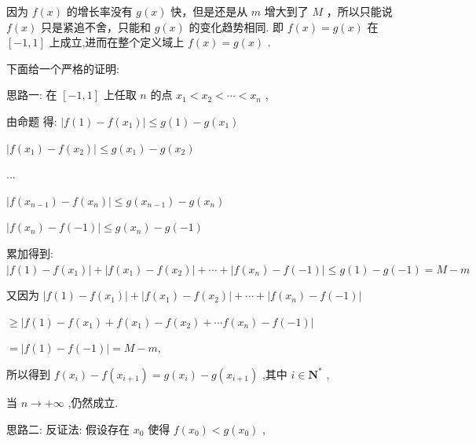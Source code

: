 \documentclass[10pt]{article}
\newcommand*\circled[1]{\tikz[baseline=(char.base)]{\node[shape=circle,draw,inner sep=1.5pt] (char) {\small #1};}}
\begin{document}
因为 \(f\left( x\right)\) 的增长率没有 \(g\left( x\right)\) 快，但是还是从 \(m\) 增大到了 \(M\) ，所以只能说 \(f\left( x\right)\) 只是紧追不舍，只能和 \(g\left( x\right)\) 的变化趋势相同. 即 \(f\left( x\right)  = g\left( x\right)\) 在 \(\left\lbrack  {-1,1}\right\rbrack\) 上成立,进而在整个定义域上 \(f\left( x\right)  = g\left( x\right)\) .

下面给一个严格的证明:

思路一: 在 \(\left\lbrack  {-1,1}\right\rbrack\) 上任取 \(n\) 的点 \({x}_{1} < {x}_{2} < \cdots  < {x}_{n}\) ,

由命题 \circled{1} 得: \(\left| {f\left( 1\right)  - f\left( {x}_{1}\right) }\right|  \leq  g\left( 1\right)  - g\left( {x}_{1}\right)\)

\(\left| {f\left( {x}_{1}\right)  - f\left( {x}_{2}\right) }\right|  \leq  g\left( {x}_{1}\right)  - g\left( {x}_{2}\right)\)

...

\(\left| {f\left( {x}_{n - 1}\right)  - f\left( {x}_{n}\right) }\right|  \leq  g\left( {x}_{n - 1}\right)  - g\left( {x}_{n}\right)\)

\(\left| {f\left( {x}_{n}\right)  - f\left( {-1}\right) }\right|  \leq  g\left( {x}_{n}\right)  - g\left( {-1}\right)\)

累加得到: \(\left| {f\left( 1\right)  - f\left( {x}_{1}\right) }\right|  + \left| {f\left( {x}_{1}\right)  - f\left( {x}_{2}\right) }\right|  + \cdots  + \left| {f\left( {x}_{n}\right)  - f\left( {-1}\right) }\right|  \leq  g\left( 1\right)  - g\left( {-1}\right)  = M - m\)

又因为 \(\left| {f\left( 1\right)  - f\left( {x}_{1}\right) }\right|  + \left| {f\left( {x}_{1}\right)  - f\left( {x}_{2}\right) }\right|  + \cdots  + \left| {f\left( {x}_{n}\right)  - f\left( {-1}\right) }\right|\)

\(\geq  \left| {f\left( 1\right)  - f\left( {x}_{1}\right)  + f\left( {x}_{1}\right)  - f\left( {x}_{2}\right)  + \cdots f\left( {x}_{n}\right)  - f\left( {-1}\right) }\right|\)

\(= \left| {f\left( 1\right)  - f\left( {-1}\right) }\right|  = M - m,\)

所以得到 \(f\left( {x}_{i}\right)  - f\left( {x}_{i + 1}\right)  = g\left( {x}_{i}\right)  - g\left( {x}_{i + 1}\right)\) ,其中 \(i \in  {\mathbf{N}}^{ * }\) ,

当 \(n \rightarrow   + \infty\) ,仍然成立.

思路二: 反证法: 假设存在 \({x}_{0}\) 使得 \(f\left( {x}_{0}\right)  < g\left( {x}_{0}\right)\) ,
\end{document}

